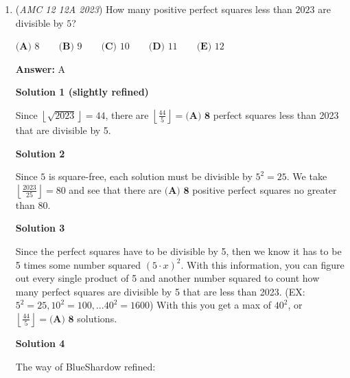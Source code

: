 \begin{enumerate}
 So $\frac{P}{3}$ + $\frac{7}{8}$ pound = $\frac{3}{4} P$ + $\frac{1}{8}$ pound; $\frac{P}{3}$ + $\frac{3}{4}$ pound = $\frac{3}{4} P$.

 Multiplying both sides by $\text{lcm}(3,4) = 12$, we have$4P + 9 = 9P$; $5P = 9$; $P$ = weight of a large pizza = $\frac{9}{5}$ pounds = $\boxed{\textbf{(A)}1 \frac{4}{5}}$ pounds. 

 


 


 


	\item (\textit{AMC 12 12A 2023}) How many positive perfect squares less than $2023$ are divisible by $5$?


 $\textbf{(A) }8\qquad\textbf{(B) }9\qquad\textbf{(C) }10\qquad\textbf{(D) }11\qquad\textbf{(E) }12$

 \textbf{Answer: }A



\textbf{Solution 1 (slightly refined)}

Since $\left \lfloor{\sqrt{2023}}\right \rfloor = 44$, there are $\left \lfloor{\frac{44}{5}}\right \rfloor = \boxed{\textbf{(A) 8}}$ perfect squares less than 2023 that are divisible by 5.

 



\textbf{Solution 2}

Since $5$ is square-free, each solution must be divisible by $5^2=25$. We take $\left \lfloor{\frac{2023}{25}}\right \rfloor = 80$ and see that there are $\boxed{\textbf{(A) 8}}$ positive perfect squares no greater than $80$.

 



\textbf{Solution 3}

Since the perfect squares have to be divisible by 5, then we know it has to be 5 times some number squared $(5 \cdot x)^{2}$. With this information, you can figure out every single product of 5 and another number squared to count how many perfect squares are divisible by 5 that are less than 2023. (EX: $5^{2} = 25, 10^{2} = 100, ... 40^{2} = 1600$) With this you get a max of $40^{2}$, or  $\left \lfloor{\frac{44}{5}}\right \rfloor = \boxed{\textbf{(A) 8}}$ solutions. 

 



\textbf{Solution 4}

The way of BlueShardow refined:


\end{enumerate}
